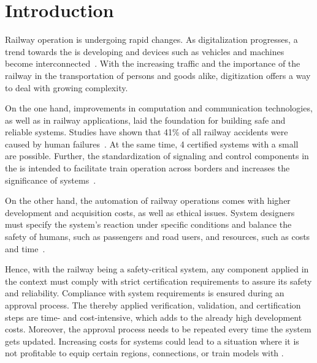 \chapter{Introduction}


Railway operation is undergoing rapid changes.
%
As digitalization progresses, a trend towards the  is developing and devices such as vehicles and machines become interconnected~\cite{RailwayDigitalization}.
With the increasing traffic and the importance of the railway in the transportation of persons and goods alike, digitization offers a way to deal with growing complexity.

On the one hand, improvements in computation and communication technologies, as well as in railway applications, laid the foundation for building safe and reliable systems.
Studies have shown that 41\% of all railway accidents were caused by human failures~\cite{StudyRailwayAccidents}.
At the same time,  4 certified  systems with a small ~\cite{SallekSIL} are possible.
Further, the standardization of signaling and control components in the  is intended to facilitate train operation across borders and increases the significance of  systems~\cite{YIN2017RNDofATO}.

On the other hand, the automation of railway operations comes with higher development and acquisition costs, as well as ethical issues.
System designers must specify the system's reaction under specific conditions and balance the safety of humans, such as passengers and road users, and resources, such as costs and time~\cite{EthicsInSafety}.

Hence, with the railway being a safety-critical system, any component applied in the  context must comply with strict certification requirements to assure its safety and reliability.
Compliance with system requirements is ensured during an approval process.
The thereby applied verification, validation, and certification steps are time- and cost-intensive, which adds to the already high development costs.
Moreover, the approval process needs to be repeated every time the system gets updated.
Increasing costs for  systems could lead to a situation where it is not profitable to equip certain regions, connections, or train models with .
\\

